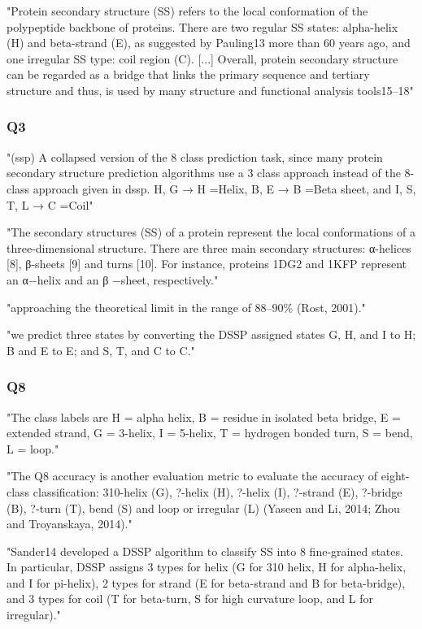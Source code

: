  "Protein secondary structure (SS) refers to the local conformation of the polypeptide backbone of proteins. There are two regular SS states: alpha-helix (H) and beta-strand (E), as suggested by Pauling13 more than 60 years ago, and one irregular SS type: coil region (C). [...] Overall, protein secondary structure can be regarded as a bridge that links the primary sequence and tertiary structure and thus, is used by many structure and functional analysis tools15–18" \cite{Wang2016}
  \subsubsection{Q3}
  "(ssp) A collapsed version of the 8 class prediction task, since many protein secondary structure prediction algorithms use a 3 class approach instead of the 8-class approach given in dssp. {H, G} → H =Helix, {B, E} → B =Beta sheet, and {I, S, T, L} → C =Coil" \cite{Lin2016}

  "The secondary structures (SS) of a protein represent the local conformations of a three-dimensional structure. There are three main secondary structures: α-helices [8], β-sheets [9] and turns [10]. For instance, proteins 1DG2 and 1KFP represent an α−helix and an β −sheet, respectively." \cite{Hattori2017}

  "approaching the theoretical limit in the range of 88–90\% (Rost, 2001)." \cite{Heffernan2017}

  "we predict three states by converting the DSSP assigned states G, H, and I to H; B and E to E; and S, T, and C to C." \cite{Heffernan2017}
  \subsubsection{Q8}
  "The class labels are H = alpha helix, B = residue in isolated beta bridge, E = extended strand, G = 3-helix, I = 5-helix, T = hydrogen bonded turn, S = bend, L = loop." \cite{Lin2016}

  "The Q8 accuracy is another evaluation metric to evaluate the accuracy of eight-class classification: 310-helix (G), ?-helix (H), ?-helix (I), ?-strand (E), ?-bridge (B), ?-turn (T), bend (S) and loop or irregular (L) (Yaseen and Li, 2014; Zhou and Troyanskaya, 2014)." \cite{Fang2017}

  "Sander14 developed a DSSP algorithm to classify SS into 8 fine-grained states. In particular, DSSP assigns 3 types for helix (G for 310 helix, H for alpha-helix, and I for pi-helix), 2 types for strand (E for beta-strand and B for beta-bridge), and 3 types for coil (T for beta-turn, S for high curvature loop, and L for irregular)." \cite{Wang2016}

